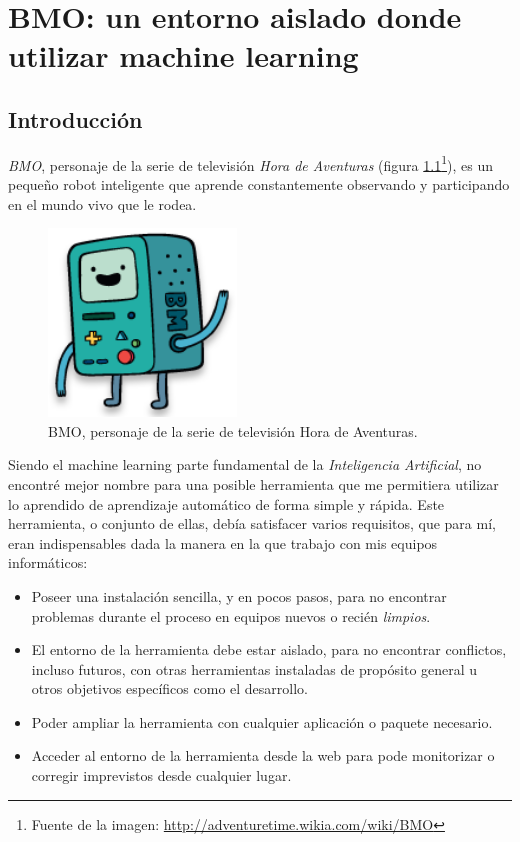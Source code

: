\chapter{BMO: un entorno aislado donde utilizar machine learning} \label{chap:4}

\vspace*{5mm}

\section{Introducción} \label{sec:4.1}

\emph{BMO}, personaje de la serie de televisión \emph{Hora de Aventuras} (figura \ref{fig:4.1}\footnote{Fuente de la imagen: \url{http://adventuretime.wikia.com/wiki/BMO}}), es un pequeño robot inteligente que aprende constantemente observando y participando en el mundo vivo que le rodea.

\begin{figure}[ht]
  \centering
  \includegraphics[width=50mm]{figures/ch_04/bmo_adventure_time.png}
  \caption{BMO, personaje de la serie de televisión Hora de Aventuras.}
  \label{fig:4.1}
\end{figure}

Siendo el machine learning parte fundamental de la \emph{Inteligencia Artificial}, no encontré mejor nombre para una posible herramienta que me permitiera utilizar lo aprendido de aprendizaje automático de forma simple y rápida. Este herramienta, o conjunto de ellas, debía satisfacer varios requisitos, que para mí, eran indispensables dada la manera en la que trabajo con mis equipos informáticos:

\begin{itemize}
\item[\textbullet] Poseer una instalación sencilla, y en pocos pasos, para no encontrar problemas durante el proceso en equipos nuevos o recién \emph{limpios}.

\item[\textbullet] El entorno de la herramienta debe estar aislado, para no encontrar conflictos, incluso futuros, con otras herramientas instaladas de propósito general u otros objetivos específicos como el desarrollo.

\item[\textbullet] Poder ampliar la herramienta con cualquier aplicación o paquete necesario.

\item[\textbullet] Acceder al entorno de la herramienta desde la web para pode monitorizar o corregir imprevistos desde cualquier lugar.
\end{itemize}


